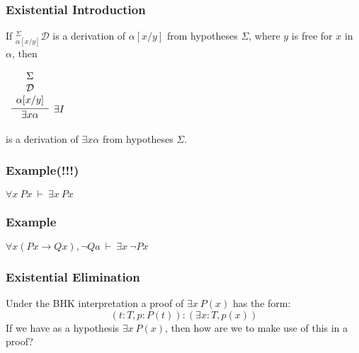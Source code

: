 \documentclass{beamer}
\theoremstyle{indentDefn} \newtheorem{defn}[]{Definition}
\begin{document}
\begin{frame}
	\frametitle{Existential Introduction}
	
	If $^{\Sigma}_{\alpha[x/y]}\mathcal{D}$ is a derivation of $\alpha[x/y]$ from hypotheses $\Sigma$, where $y$ is free for $x$ in $\alpha$, then
	
	\vspace{0.5cm}
	
	\begin{center}
		$\begin{array}{c}
		\infer[\exists I]{\exists x \alpha}{\begin{array}{c} 
			\Sigma \\
			\mathcal{D} \\ 
			\alpha[x/y]			
			\end{array}}
		\end{array}$
	\end{center}
	
	is a derivation of $\exists x \alpha$ from hypotheses $\Sigma$. 
	
\end{frame}

\begin{frame}
	\frametitle{Example(!!!)}
	
	$\forall x \ Px \ \vdash \ \exists x \ Px$
	
	\vspace{60mm}
	
	
\end{frame}

\begin{frame}
	\frametitle{Example}
	
	$\forall x (Px \rightarrow Qx), \lnot Qa \ \vdash \ \exists x \ \lnot Px$
	
	\vspace{60mm}	
\end{frame}

\begin{frame}
	\frametitle{Existential Elimination}

	Under the BHK interpretation a proof of $\exists x \ P(x)$ has the form: 
	$$(t : T, p : P(t)) : (\exists x : T, p(x))$$
	If we have as a hypothesis $\exists x \ P(x)$, then how are we to make use of this in a proof? 

	\vspace{50mm}


\end{frame}
\end{document}
